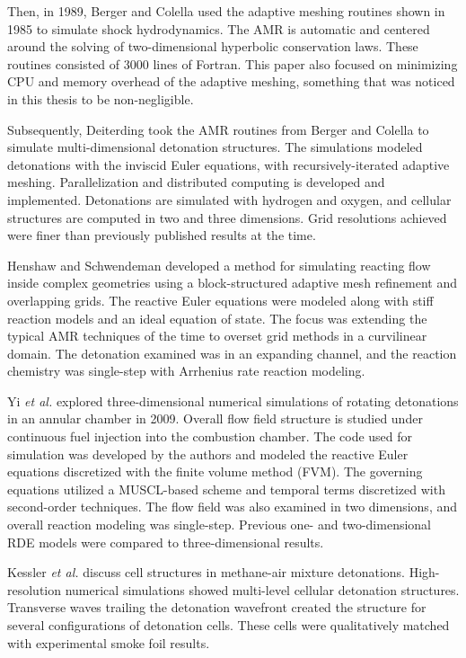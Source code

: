 Then, in 1989, Berger and Colella  \cite{berger1989} used the adaptive meshing routines shown in 1985 to simulate shock hydrodynamics. The AMR is automatic and centered around the solving of two-dimensional hyperbolic conservation laws. These routines consisted of 3000 lines of Fortran. This paper also focused on minimizing CPU and memory overhead of the adaptive meshing, something that was noticed in this thesis to be non-negligible. 

Subsequently, Deiterding  \cite{deiterding} took the AMR routines from Berger and Colella to simulate multi-dimensional detonation structures. The simulations modeled detonations with the inviscid Euler equations, with recursively-iterated adaptive meshing. Parallelization and distributed computing is developed and implemented. Detonations are simulated with hydrogen and oxygen, and cellular structures are computed in two and three dimensions. Grid resolutions achieved were finer than previously published results at the time. 

Henshaw and Schwendeman developed a method \cite{henshaw} for simulating reacting flow inside complex geometries using a block-structured adaptive mesh refinement and overlapping grids. The reactive Euler equations were modeled along with stiff reaction models and an ideal equation of state. The focus was extending the typical AMR techniques of the time to overset grid methods in a curvilinear domain. The detonation examined was in an expanding channel, and the reaction chemistry was single-step with Arrhenius rate reaction modeling. 

Yi \textit{et al.} \cite{yi} explored three-dimensional numerical simulations of rotating detonations in an annular chamber in 2009. Overall flow field structure is studied under continuous fuel injection into the combustion chamber. The code used for simulation was developed by the authors and modeled the reactive Euler equations discretized with the finite volume method (FVM). The governing equations utilized a MUSCL-based scheme \cite{vanleer} and temporal terms discretized with second-order techniques. The flow field was also examined in two dimensions, and overall reaction modeling was single-step. Previous one- and two-dimensional RDE models were compared to three-dimensional results. 

Kessler \textit{et al.} \cite{kessler} discuss cell structures in methane-air mixture detonations. High-resolution numerical simulations showed multi-level cellular detonation structures. Transverse waves trailing the detonation wavefront created the structure for several configurations of detonation cells. These cells were qualitatively matched with experimental smoke foil results. 

